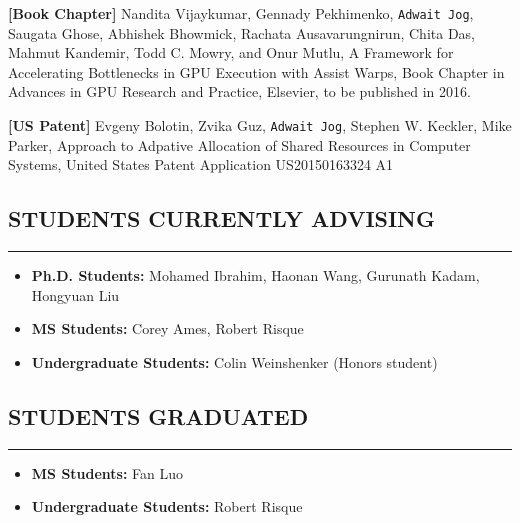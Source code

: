 \documentclass[10pt,a4]{article}
\begin{document}
\begin{description}

\item{\bf [Book Chapter]}
Nandita Vijaykumar, Gennady Pekhimenko, {\tt Adwait Jog}, Saugata Ghose, Abhishek Bhowmick, 
Rachata Ausavarungnirun, Chita Das, Mahmut Kandemir, Todd C. Mowry, and Onur Mutlu, 
A Framework for Accelerating Bottlenecks in GPU Execution with Assist Warps, 
Book Chapter in Advances in GPU Research and Practice, Elsevier, to be published in 2016. 

\item{\bf [US Patent]}
Evgeny Bolotin, Zvika Guz, {\tt Adwait Jog}, Stephen W. Keckler, Mike Parker, 
Approach to Adpative Allocation of Shared Resources in Computer Systems, 
United States Patent Application US20150163324 A1 

\end{description}

\subsection*{STUDENTS CURRENTLY ADVISING}
\hrule
\vspace{0.2cm}
\begin{itemize}
\item {\bf Ph.D. Students:} Mohamed Ibrahim, Haonan Wang, Gurunath Kadam, Hongyuan Liu
\item {\bf MS Students:}  Corey Ames, Robert Risque 
\item {\bf Undergraduate Students:}  Colin Weinshenker (Honors student)
\end{itemize}

\subsection*{STUDENTS GRADUATED}
\hrule
\vspace{0.2cm}
\begin{itemize}
\item {\bf MS Students:}  Fan Luo 
\item {\bf Undergraduate Students:}  Robert Risque
\end{itemize}
\end{document}
